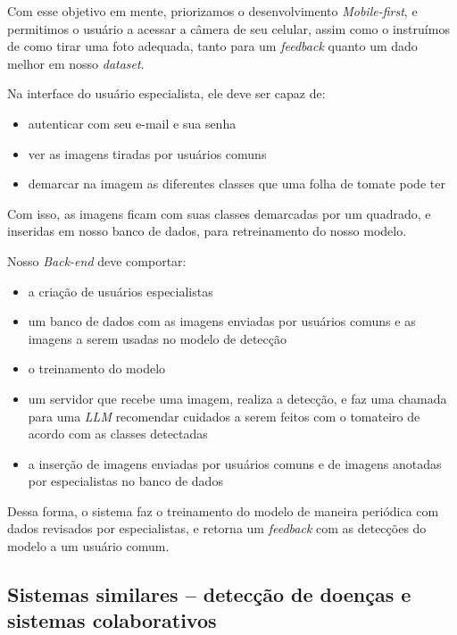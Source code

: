 Com esse objetivo em mente, priorizamos o desenvolvimento \textit{Mobile-first}, e permitimos o usuário a acessar a câmera de seu celular, assim como o instruímos de como tirar uma foto adequada, tanto para um \textit{feedback} quanto um dado melhor em nosso \textit{dataset}.


Na interface do usuário especialista, ele deve ser capaz de:

\begin{itemize}
    \item autenticar com seu e-mail e sua senha
    \item ver as imagens tiradas por usuários comuns
    \item demarcar na imagem as diferentes classes que uma folha de tomate pode ter
\end{itemize}

Com isso, as imagens ficam com suas classes demarcadas por um quadrado, e inseridas em nosso banco de dados, para retreinamento do nosso modelo. 


Nosso \emph{Back-end} deve comportar:

\begin{itemize}
    \item a criação de usuários especialistas
    \item um banco de dados com as imagens enviadas por usuários comuns e as imagens a serem usadas no modelo de detecção
    \item o treinamento do modelo
    \item um servidor que recebe uma imagem, realiza a detecção, e faz uma chamada para uma \emph{LLM} recomendar cuidados a serem feitos com o tomateiro de acordo com as classes detectadas
    \item a inserção de imagens enviadas por usuários comuns e de imagens anotadas por especialistas no banco de dados
\end{itemize}

Dessa forma, o sistema faz o treinamento do modelo de maneira periódica com dados revisados por especialistas, e retorna um \textit{feedback} com as detecções do modelo a um usuário comum.

\subsection{{Sistemas similares -- detecção de doenças e sistemas colaborativos}}

